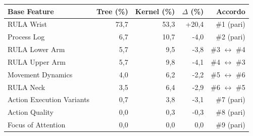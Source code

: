 \begin{tabular*}{\linewidth}{@{}l@{\extracolsep{\fill}}rrrr@{}}
\toprule
\textbf{Base Feature} & \textbf{Tree (\%)} & \textbf{Kernel (\%)} & \textbf{$\Delta$ (\%)} & \textbf{Accordo} \\
\midrule
RULA Wrist & 73{,}7 & 53{,}3 & +20{,}4 & \#1 (pari) \\
Process Log & 6{,}7 & 10{,}7 & -4{,}0 & \#2 (pari) \\
RULA Lower Arm & 5{,}7 & 9{,}5 & -3{,}8 & \#3 $\leftrightarrow$ \#4 \\
RULA Upper Arm & 5{,}7 & 9{,}8 & -4{,}1 & \#4 $\leftrightarrow$ \#3 \\
Movement Dynamics & 4{,}0 & 6{,}2 & -2{,}2 & \#5 $\leftrightarrow$ \#6 \\
RULA Neck & 3{,}5 & 6{,}4 & -2{,}9 & \#6 $\leftrightarrow$ \#5 \\
Action Execution Variants & 0{,}7 & 3{,}8 & -3{,}1 & \#7 (pari) \\
Action Quality & 0{,}0 & 0{,}3 & -0{,}3 & \#8 (pari) \\
Focus of Attention & 0{,}0 & 0{,}0 & 0{,}0 & \#9 (pari) \\
\bottomrule
\end{tabular*}
